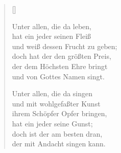\begin{center}
\settowidth{\versewidth}{Unter allen, die da singen}
\begin{verse}[\versewidth]

 Unter allen, die da leben,\\
hat ein jeder seinen Fleiß\\
und weiß dessen Frucht zu geben;\\
doch hat der den größten Preis,\\
der dem Höchsten Ehre bringt\\
und von Gottes Namen singt.

 Unter allen, die da singen\\
und mit wohlgefaßter Kunst\\
ihrem Schöpfer Opfer bringen,\\
hat ein jeder seine Gunst;\\
doch ist der am besten dran,\\
der mit Andacht singen kann.

\end{verse}
\end{center}
